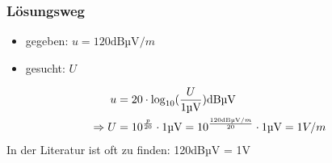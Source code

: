 \begin{frame}
\frametitle{Lösungsweg}
\begin{itemize}
  \item gegeben: $u = 120\textrm{dBµV}/m$
  \item gesucht: $U$
  \end{itemize}
    \pause
    \begin{equation}\begin{align} \nonumber u &= 20\cdot \log_{10}(\frac{U}{1\textrm{µV}})\textrm{\textrm{dBµV}}\\ \nonumber \Rightarrow U &= 10^{\frac{p}{20}} \cdot 1\textrm{µV} = 10^{\frac{120\textrm{dBµV}/m}{20}} \cdot 1\textrm{µV} = 1V/m \end{align}\end{equation}
    \pause
    In der Literatur ist oft zu finden: 120dBµV = 1V



\end{frame}%
